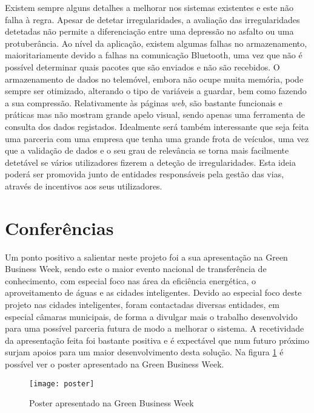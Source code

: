 Existem sempre alguns detalhes a melhorar nos sistemas existentes e este não falha à regra.
Apesar de detetar irregularidades, a avaliação das irregularidades detetadas não permite a diferenciação entre uma depressão no asfalto ou uma protuberância.
Ao nível da aplicação, existem algumas falhas no armazenamento, maioritariamente devido a falhas na comunicação Bluetooth, uma vez que não é possível determinar quais pacotes que são enviados e não são recebidos.
O armazenamento de dados no telemóvel, embora não ocupe muita memória, pode sempre ser otimizado, alterando o tipo de variáveis a guardar, bem como fazendo a sua compressão.
Relativamente às páginas \emph{web}, são bastante funcionais e práticas mas não mostram grande apelo visual, sendo apenas uma ferramenta de consulta dos dados registados.
Idealmente será também interessante que seja feita uma parceria com uma empresa que tenha uma grande frota de veículos, uma vez que a validação de dados e o seu grau de relevância se torna mais facilmente detetável se vários utilizadores fizerem a deteção de irregularidades.
Esta ideia poderá ser promovida junto de entidades responsáveis pela gestão das vias, através de incentivos aos seus utilizadores.

\section{Conferências}
\label{sec:conferencias}

Um ponto positivo a salientar neste projeto foi a sua apresentação na Green Business Week, sendo este o maior evento nacional de transferência de conhecimento, com especial foco nas área da eficiência energética, o aproveitamento de águas e as cidades inteligentes.
Devido ao especial foco deste projeto nas cidades inteligentes, foram contactadas diversas entidades, em especial câmaras municipais, de forma a divulgar mais o trabalho desenvolvido para uma possível parceria futura de modo a melhorar o sistema.
A recetividade da apresentação feita foi bastante positiva e é expectável que num futuro próximo surjam apoios para um maior desenvolvimento desta solução.
Na figura \ref{fig:poster} é possível ver o poster apresentado na Green Business Week.

\begin{figure}[hbtp]
	\centering
	\texttt{[image: poster]}
	\caption{Poster apresentado na Green Business Week}
	\label{fig:poster}
\end{figure}